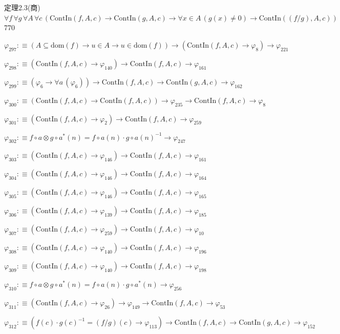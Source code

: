 \begin{fullproof}{定理2.3(商)}{$\forall f\,\forall g\,\forall A\,\forall c\,(\mathrm{ContIn}(f,A,c) \to \mathrm{ContIn}(g,A,c) \to \forall x \in A\,(g(x) \neq 0) \to \mathrm{ContIn}((f / g),A,c))$}{770}
\begin{abbrevlist}
\item $\varphi_{297} :\equiv (A \subseteq \mathrm{dom}(f) \to u \in A \to u \in \mathrm{dom}(f)) \to (\mathrm{ContIn}(f,A,c) \to \varphi_{8}) \to \varphi_{221}$
\item $\varphi_{298} :\equiv (\mathrm{ContIn}(f,A,c) \to \varphi_{140}) \to \mathrm{ContIn}(f,A,c) \to \varphi_{161}$
\item $\varphi_{299} :\equiv (\varphi_{6} \to \forall a\,(\varphi_{6})) \to \mathrm{ContIn}(f,A,c) \to \mathrm{ContIn}(g,A,c) \to \varphi_{162}$
\item $\varphi_{300} :\equiv (\mathrm{ContIn}(f,A,c) \to \mathrm{ContIn}(f,A,c)) \to \varphi_{235} \to \mathrm{ContIn}(f,A,c) \to \varphi_{8}$
\item $\varphi_{301} :\equiv (\mathrm{ContIn}(f,A,c) \to \varphi_{2}) \to \mathrm{ContIn}(f,A,c) \to \varphi_{259}$
\item $\varphi_{302} :\equiv f \circ a \otimes g \circ a^{\ast}(n) = f \circ a(n) \cdot g \circ a(n)^{-1} \to \varphi_{247}$
\item $\varphi_{303} :\equiv (\mathrm{ContIn}(f,A,c) \to \varphi_{146}) \to \mathrm{ContIn}(f,A,c) \to \varphi_{161}$
\item $\varphi_{304} :\equiv (\mathrm{ContIn}(f,A,c) \to \varphi_{146}) \to \mathrm{ContIn}(f,A,c) \to \varphi_{164}$
\item $\varphi_{305} :\equiv (\mathrm{ContIn}(f,A,c) \to \varphi_{146}) \to \mathrm{ContIn}(f,A,c) \to \varphi_{165}$
\item $\varphi_{306} :\equiv (\mathrm{ContIn}(f,A,c) \to \varphi_{139}) \to \mathrm{ContIn}(f,A,c) \to \varphi_{185}$
\item $\varphi_{307} :\equiv (\mathrm{ContIn}(f,A,c) \to \varphi_{259}) \to \mathrm{ContIn}(f,A,c) \to \varphi_{10}$
\item $\varphi_{308} :\equiv (\mathrm{ContIn}(f,A,c) \to \varphi_{140}) \to \mathrm{ContIn}(f,A,c) \to \varphi_{196}$
\item $\varphi_{309} :\equiv (\mathrm{ContIn}(f,A,c) \to \varphi_{140}) \to \mathrm{ContIn}(f,A,c) \to \varphi_{198}$
\item $\varphi_{310} :\equiv f \circ a \otimes g \circ a^{\ast}(n) = f \circ a(n) \cdot g \circ a^{\ast}(n) \to \varphi_{256}$
\item $\varphi_{311} :\equiv (\mathrm{ContIn}(f,A,c) \to \varphi_{26}) \to \varphi_{149} \to \mathrm{ContIn}(f,A,c) \to \varphi_{53}$
\item $\varphi_{312} :\equiv (f(c) \cdot g(c)^{-1} = (f / g)(c) \to \varphi_{113}) \to \mathrm{ContIn}(f,A,c) \to \mathrm{ContIn}(g,A,c) \to \varphi_{152}$

\end{abbrevlist}
\end{fullproof}
